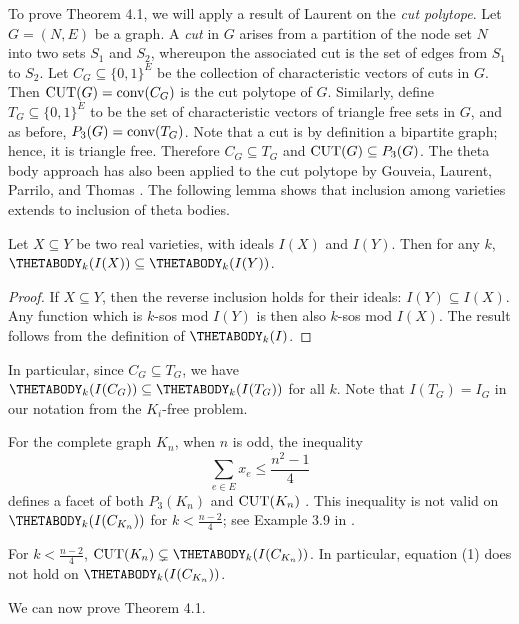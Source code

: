 To prove Theorem 4.1, we will apply a result of Laurent \cite{moniquestuff} on
the {\em cut polytope}. Let $G=(N,E)$ be a graph. A {\em cut} in $G$ arises from
a partition of the node set $N$ into two sets $S_1$ and $S_2$, whereupon the
associated cut is the set of edges from $S_1$ to $S_2$. Let $C_G \subseteq
\{0,1\}^E$ be the collection of characteristic vectors of cuts in $G$. Then
$\textup{CUT}(G) = \textup{conv}(C_G)$ is the cut polytope of $G$. Similarly,
define $T_G \subseteq \{0,1\}^E$ to be the set of characteristic vectors of
triangle free sets in $G$, and as before, $P_3(G) = \textup{conv}(T_G)$. Note
that a cut is by definition a bipartite graph; hence, it is triangle free. Therefore $C_G \subseteq T_G$ and $\textup{CUT}(G) \subseteq P_3(G)$. The theta body approach has also been applied to the cut polytope by Gouveia, Laurent, Parrilo, and Thomas \cite{GLPT}. The following lemma shows that inclusion among varieties extends to inclusion of theta bodies.

\begin{lemma}\label{ideal_inclusion}
Let $X \subseteq Y$ be two real varieties, with ideals $I(X)$ and $I(Y)$. Then for any $k$, $\THETABODY_k(I(X)) \subseteq \THETABODY_k(I(Y))$.
\end{lemma}
\begin{proof}
If $X \subseteq Y$, then the reverse inclusion holds for their ideals: $I(Y) \subseteq I(X)$. Any function which is $k$-sos mod $I(Y)$ is then also $k$-sos mod $I(X)$. The result follows from the definition of $\THETABODY_k(I)$.
\end{proof}
In particular, since $C_G \subseteq T_G$, we have $\THETABODY_k(I(C_G))
\subseteq \THETABODY_k(I(T_G))$ for all $k$. Note that $I(T_G) = I_G$ in our
notation from the $K_i$-free problem.

For the complete graph $K_n$, when $n$ is odd, the inequality
\begin{equation} \sum_{e \in E} x_e \le \frac{n^2-1}{4}\end{equation}
defines a facet of both $P_3(K_n)$ and $\textup{CUT}(K_n)$ \cite{moniquestuff}.
This inequality is not valid on $\THETABODY_k(I(C_{K_n}))$ for $k < \frac{n-2}{4}$; see Example 3.9 in \cite{GLPT}.
\begin{theorem}
For $k < \frac{n-2}{4}$, $\textup{CUT}(K_n) \subsetneq
\THETABODY_{k}(I(C_{K_n}))$. In particular, equation (1) does not hold on $\THETABODY_{k}(I(C_{K_n}))$.
\end{theorem}

We can now prove Theorem 4.1.

